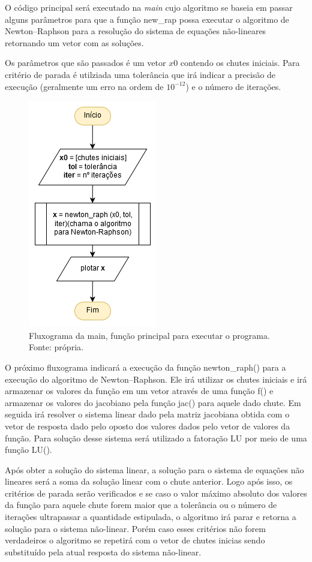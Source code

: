 \documentclass[a4paper, 12pt, openright, oneside]{article}
\begin{document}
O código principal será executado na \textit{main} cujo algoritmo se baseia em passar alguns parâmetros para que a função new\_rap possa executar o algoritmo de Newton--Raphson para a resolução do sistema de equações não-lineares retornando um vetor com as soluções.

Os parâmetros que são passados é um vetor $x0$ contendo os chutes iniciais. Para critério de parada é utilziada uma tolerância que irá indicar a precisão de execução (geralmente um erro na ordem de $10^{-12}$) e o número de iterações.

\begin{figure}[!htb]
\centering
\includegraphics[scale=0.6]{Imagens/diag_main.png}
\caption{Fluxograma da main, função principal para executar o programa. Fonte: própria.}
\label{galvanometro}
\end{figure}

O próximo fluxograma indicará a execução da função newton\_raph() para a execução do algoritmo de Newton--Raphson. Ele irá utilizar os chutes iniciais e irá armazenar os valores da função em um vetor através de uma função f() e armazenar os valores do jacobiano pela função jac() para aquele dado chute. Em seguida irá resolver o sistema linear dado pela matriz jacobiana obtida com o vetor de resposta dado pelo oposto dos valores dados pelo vetor de valores da função. Para solução desse sistema será utilizado a fatoração LU por meio de uma função LU().

Após obter a solução do sistema linear, a solução para o sistema de equações não lineares será a soma da solução linear com o chute anterior. Logo após isso, os critérios de parada serão verificados e se caso o valor máximo absoluto dos valores da função para aquele chute forem maior que a tolerância ou o número de iterações ultrapassar a quantidade estipulada, o algoritmo irá parar e retorna a solução para o sistema não-linear. Porém caso esses critérios não forem verdadeiros o algoritmo se repetirá com o vetor de chutes inicias sendo substituído pela atual resposta do sistema não-linear.
\end{document}
